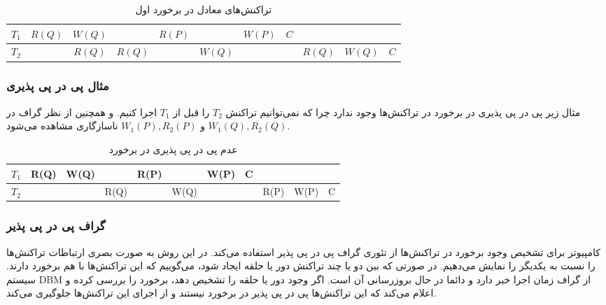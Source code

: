 \begin{LTR}
    \begin{table}[H]
        \centering
        \begin{RTL}
            \caption{تراکنش‌های معادل در برخورد اول}
        \end{RTL}
        \begin{tabular}{|c|c|c|c|c|c|c|c|c|c|c|}
            \hline
            $T_{1}$ & $R(Q)$ & $W(Q)$ & & $R(P)$ & & $W(P)$ & $C$ & & & \\ \hline
            $T_{2}$ & & $R(Q)$ & $R(Q)$ & & $W(Q)$ & &  & $R(Q)$ & $W(Q)$ & $C$ \\ \hline
        \end{tabular}
    \end{table}
\end{LTR}

\subsubsection*{مثال پی در پی پذیری}

مثال زیر پی در پی پذیری در برخورد در تراکنش‌ها وجود ندارد چرا که نمی‌توانیم
تراکنش $T_2$ را قبل از $T_1$ اجرا کنیم. و همچنین از نظر گراف در $W_1(Q),R_2(Q)$
و $W_1(P),R_2(P)$ ناسازگاری مشاهده می‌شود.

\begin{LTR}
    \begin{table}[H]
        \centering
        \begin{RTL}
            \caption{عدم پی در پی پذیری در برخورد}
        \end{RTL}
        \begin{tabular}{|c|c|c|c|c|c|c|c|c|c|c|}
            \hline
            $T_{1}$ & R(Q) & W(Q) & & R(P) & & W(P) & C & & & \\ \hline
            $T_{2}$ & & & R(Q) & & W(Q) & & & R(P) & W(P) & C  \\ \hline
        \end{tabular}
    \end{table}
\end{LTR}

\subsubsection{گراف پی در پی پذیر}

کامپیوتر برای تشخیص وجود برخورد در تراکنش‌ها از تئوری گراف پی در پی پذیر استفاده
می‌کند. در این روش به صورت بصری ارتباطات تراکنش‌ها را ‌نسبت به یکدیگر را نمایش
می‌دهیم. در صورتی که بین دو یا چند تراکنش دور یا حلقه ایجاد شود، می‌گوییم که این
تراکنش‌ها با هم برخورد دارند. سیستم DBM از گراف زمان اجرا خبر دارد و دائما در
حال بروزرسانی آن است. اگر وجود دور یا حلقه را تشخیص دهد، برخورد را بررسی کرده و
اعلام می‌کند که این تراکنش‌ها پی در پی پذیر در برخورد نیستند و از اجرای این
تراکنش‌ها جلوگیری می‌کند.

